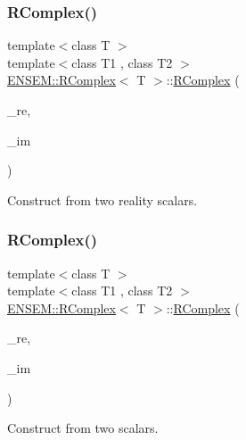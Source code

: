 \subsubsection{\texorpdfstring{RComplex()}{RComplex()}\hspace{0.1cm}{\footnotesize\ttfamily [6/12]}}
{\footnotesize\ttfamily template$<$class T $>$ \\
template$<$class T1 , class T2 $>$ \\
\mbox{\hyperlink{classENSEM_1_1RComplex}{E\+N\+S\+E\+M\+::\+R\+Complex}}$<$ T $>$\+::\mbox{\hyperlink{classENSEM_1_1RComplex}{R\+Complex}} (\begin{DoxyParamCaption}\item[{const \mbox{\hyperlink{classENSEM_1_1RScalar}{R\+Scalar}}$<$ T1 $>$ \&}]{\+\_\+re,  }\item[{const \mbox{\hyperlink{classENSEM_1_1RScalar}{R\+Scalar}}$<$ T2 $>$ \&}]{\+\_\+im }\end{DoxyParamCaption})\hspace{0.3cm}{\ttfamily [inline]}}



Construct from two reality scalars. 

\mbox{\label{classENSEM_1_1RComplex_aa67055e36f9e7d7709eb98453901b0ba}} 
\subsubsection{\texorpdfstring{RComplex()}{RComplex()}\hspace{0.1cm}{\footnotesize\ttfamily [7/12]}}
{\footnotesize\ttfamily template$<$class T $>$ \\
template$<$class T1 , class T2 $>$ \\
\mbox{\hyperlink{classENSEM_1_1RComplex}{E\+N\+S\+E\+M\+::\+R\+Complex}}$<$ T $>$\+::\mbox{\hyperlink{classENSEM_1_1RComplex}{R\+Complex}} (\begin{DoxyParamCaption}\item[{const T1 \&}]{\+\_\+re,  }\item[{const T2 \&}]{\+\_\+im }\end{DoxyParamCaption})\hspace{0.3cm}{\ttfamily [inline]}}



Construct from two scalars. 

